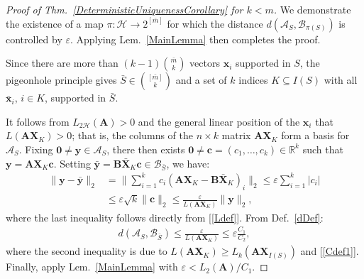 \documentclass[9pt,twocolumn]{pnas-new}
\renewcommand{\eqref}[1]{\textnormal{[\ref{#1}]}}
\begin{document}
\begin{proof}[Proof of Thm.~\ref{DeterministicUniquenessCorollary} for $k < m$] 
We demonstrate the existence of a map $\pi: \mathcal{H} \to 2^{[\bar m]}$ for which the distance $d(\bm{\mathcal{A}}_S, \bm{\mathcal{B}}_{\pi(S)})$ is controlled by $\varepsilon$. Applying Lem.~\ref{MainLemma} then completes the proof. 


Since there are more than $(k-1){\bar m \choose k}$ vectors $\mathbf{x}_i$ supported in $S$, the pigeonhole principle gives $\bar S \in {[\bar m] \choose k}$ and a set of $k$ indices $K \subseteq I(S)$ with all $\mathbf{\bar x}_i$, $i \in K$, supported in $\bar S$.

It follows from $L_{2\mathcal{H}}(\mathbf{A}) > 0$ and the general linear position of the $\mathbf{x}_i$ that $L(\mathbf{AX}_{K}) > 0$; that is, the columns of the $n \times k$ matrix $\mathbf{AX}_K$ form a basis for $\bm{\mathcal{A}}_S$. Fixing $\mathbf{0} \neq \mathbf{y} \in \bm{\mathcal{A}}_S$, there then exists $\mathbf{0} \neq \mathbf{c} = (c_1, \ldots, c_k) \in \mathbb{R}^k$ such that $\mathbf{y} = \mathbf{AX}_K\mathbf{c}$. Setting \mbox{$\mathbf{\bar{y}} = \mathbf{B\bar{X}}_K\mathbf{c} \in \bm{\mathcal{B}}_{\bar S}$}, we have:
\begin{align*}
\|\mathbf{y} - \mathbf{\bar{y}}\|_2 
&= \|\sum_{i=1}^k c_i(\mathbf{AX}_K - \mathbf{B\bar{X}}_K)_i\|_2
\leq \varepsilon \sum_{i=1}^k |c_i| \\
&\leq \varepsilon \sqrt{k}  \|\mathbf{c}\|_2 
\leq \frac{\varepsilon}{L(\mathbf{AX}_K)} \|\mathbf{y}\|_2,
\end{align*}
where the last inequality follows directly from \eqref{Ldef}. From Def.~\ref{dDef}:
\begin{align}\label{rhs222}
d(\bm{\mathcal{A}}_S, \bm{\mathcal{B}}_{\bar S}) 
\leq \frac{\varepsilon}{  L(\mathbf{AX}_{K}) } \leq \varepsilon \frac{C_1}{C_2},
\end{align}
%
where the second inequality is due to $L(\mathbf{AX}_{K}) \geq L_k(\mathbf{AX}_{I(S)})$ and \eqref{Cdef1}. Finally, apply Lem.~\ref{MainLemma} with $\varepsilon < L_2(\mathbf{A})/C_1$.
\end{proof}
\end{document}
